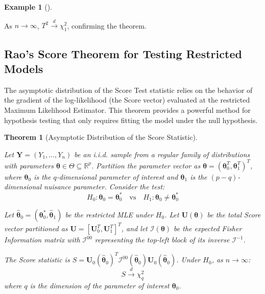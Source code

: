 \documentclass[
  letterpaper,
  DIV=11,
  numbers=noendperiod]{scrreprt}
\renewcommand{\[}{\begin{equation}}
\renewcommand{\]}{\end{equation}}
\theoremstyle{definition}
\theoremstyle{plain}
\theoremstyle{plain}
\theoremstyle{plain}
\newtheorem{theorem}{Theorem}[chapter]
\theoremstyle{definition}
\newtheorem{example}{Example}[chapter]
\theoremstyle{plain}
\theoremstyle{remark}
\begin{document}
\begin{example}[]
\begin{enumerate}
  As \(n \to \infty\), \(T^2 \xrightarrow{d} \chi^2_1\), confirming the
  theorem.
\end{enumerate}

\end{example}

\subsection{Rao's Score Theorem for Testing Restricted
Models}\label{raos-score-theorem-for-testing-restricted-models}

The asymptotic distribution of the Score Test statistic relies on the
behavior of the gradient of the log-likelihood (the Score vector)
evaluated at the restricted Maximum Likelihood Estimator. This theorem
provides a powerful method for hypothesis testing that only requires
fitting the model under the null hypothesis.

\begin{theorem}[Asymptotic Distribution of the Score
Statistic]\protect\hypertarget{thm-score}{}\label{thm-score}

Let \(\mathbf{Y} = (Y_1, \dots, Y_n)\) be an i.i.d. sample from a
regular family of distributions with parameters
\(\boldsymbol{\theta} \in \Theta \subseteq \mathbb{R}^{p}\). Partition
the parameter vector as
\(\boldsymbol{\theta} = (\boldsymbol{\theta}_0^T, \boldsymbol{\theta}_1^T)^T\),
where \(\boldsymbol{\theta}_0\) is the \(q\)-dimensional parameter of
interest and \(\boldsymbol{\theta}_1\) is the \((p-q)\)-dimensional
nuisance parameter. Consider the test:
\[H_0: \boldsymbol{\theta}_0 = \boldsymbol{\theta}_0^* \quad \text{vs} \quad H_1: \boldsymbol{\theta}_0 \neq \boldsymbol{\theta}_0^*\]

Let
\(\hat{\boldsymbol{\theta}}_0 = (\boldsymbol{\theta}_0^*, \hat{\boldsymbol{\theta}}_1)\)
be the restricted MLE under \(H_0\). Let
\(\mathbf{U}(\boldsymbol{\theta})\) be the total Score vector
partitioned as \(\mathbf{U} = [\mathbf{U}_0^T, \mathbf{U}_1^T]^T\), and
let \(\mathcal{I}(\boldsymbol{\theta})\) be the expected Fisher
Information matrix with \(\mathcal{I}^{00}\) representing the top-left
block of its inverse \(\mathcal{I}^{-1}\).

The Score statistic is
\(S = \mathbf{U}_0(\hat{\boldsymbol{\theta}}_0)^T \mathcal{I}^{00}(\hat{\boldsymbol{\theta}}_0) \mathbf{U}_0(\hat{\boldsymbol{\theta}}_0)\).
Under \(H_0\), as \(n \to \infty\): \[S \xrightarrow{d} \chi^2_q\] where
\(q\) is the dimension of the parameter of interest
\(\boldsymbol{\theta}_0\).

\end{theorem}
\end{document}
